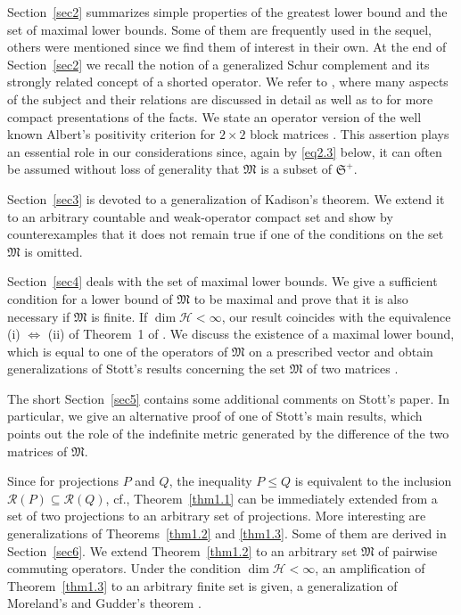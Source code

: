\documentclass[12pt, a4paper, reqno, twoside]{amsart}
\numberwithin{equation}{section}
\newcommand{\frakS}{\mathfrak S}
\newcommand{\frakM}{\mathfrak M}
\newcommand{\cf}{\mbox{cf.}\xspace}
\theoremstyle{definition}
\theoremstyle{remark}
\theoremstyle{mystyle}
\begin{document}
Section~\ref{sec2} summarizes simple properties of the greatest lower
bound  and the set of maximal lower bounds. Some of them are
frequently  used in the sequel, others were mentioned since we find
them  of interest in their own. At the end of Section~\ref{sec2}
we recall the notion of a generalized Schur complement and its
strongly related concept of a shorted operator. We refer to
\cite{Shmulyan1959}, where many aspects of the subject and their
relations are discussed in detail as well as to \cite{Anderson1971,
AndersonTrapp1975} for more compact presentations of the facts. We
state an  operator version of the well known Albert's positivity
criterion for $2\times 2$ block matrices \cite{Albert1969}. This
assertion plays an essential role in our considerations since,
again by \eqref{eq2.3} below, it can often be assumed without loss of 
generality that $\frakM$ is a subset of $\frakS^{+}$.

Section~\ref{sec3} is devoted to a generalization of Kadison's
theorem.  We extend it to an arbitrary countable and weak-operator
compact set and show by counterexamples that it does not remain true
if  one of the conditions on the set $\frakM$ is omitted.

Section~\ref{sec4} deals with the set of maximal lower bounds. We give a
sufficient condition for a lower bound of $\frakM$ to be maximal and
prove that it is also necessary if $\frakM$ is finite. If
$\dim\mathscr H <\infty$, our result coincides with the equivalence
(i) $\Leftrightarrow$ (ii) of Theorem~1 of \cite{GaubertStott2017}. We
discuss the existence of a maximal lower bound, which is equal to one
of the operators of $\frakM$ on a prescribed vector and obtain
generalizations of Stott's results concerning the set $\frakM$ of two
matrices \cite{Stott2016arxiv}.

The short Section~\ref{sec5} contains some additional comments on Stott's
paper. In particular, we give an alternative proof of one of Stott's
main results, which points out the role of the indefinite metric
generated by the difference of the two matrices of $\frakM$.

Since for projections $P$ and $Q$, the inequality $P\leq Q$ is
equivalent to the inclusion $\mathscr R(P)\subseteq\mathscr R(Q)$,
\cf \cite[Prop.~2.5.2]{KadisonRingrose1983}, Theorem~\ref{thm1.1} can
be immediately extended from a set of two projections to an
arbitrary  set of projections. More interesting are generalizations of
Theorems~\ref{thm1.2} and \ref{thm1.3}. Some of them are derived in
Section~\ref{sec6}. We extend Theorem~\ref{thm1.2} to an arbitrary set
$\frakM$ of pairwise commuting operators. Under the condition
$\dim\mathscr H<\infty$, an amplification of Theorem~\ref{thm1.3} to
an arbitrary finite  set is given, a generalization of Moreland's and
Gudder's theorem \cite{MorelandGudder1999}.
\end{document}
